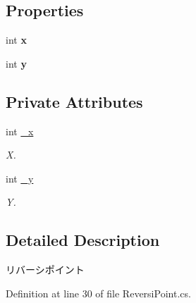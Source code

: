 \subsection*{Properties}
\begin{DoxyCompactItemize}
\item 
\mbox{\label{class_reversi_wpf_1_1_reversi_point_a11ec7c376f58804b60719a685f83fb8b}} 
int {\bfseries x}
\item 
\mbox{\label{class_reversi_wpf_1_1_reversi_point_ab397f2c0c30dd24fa825aea1f4b37539}} 
int {\bfseries y}
\end{DoxyCompactItemize}
\subsection*{Private Attributes}
\begin{DoxyCompactItemize}
\item 
\mbox{\label{class_reversi_wpf_1_1_reversi_point_ae3257bf58c3a3ea58d2dcb68e09246d9}} 
int \hyperlink{class_reversi_wpf_1_1_reversi_point_ae3257bf58c3a3ea58d2dcb68e09246d9}{\+\_\+x}
\begin{DoxyCompactList}\small\item\em X. \end{DoxyCompactList}\item 
\mbox{\label{class_reversi_wpf_1_1_reversi_point_ab13f86ec1795b79ed6fff4cee1b3cca6}} 
int \hyperlink{class_reversi_wpf_1_1_reversi_point_ab13f86ec1795b79ed6fff4cee1b3cca6}{\+\_\+y}
\begin{DoxyCompactList}\small\item\em Y. \end{DoxyCompactList}\end{DoxyCompactItemize}


\subsection{Detailed Description}
リバーシポイント 

Definition at line 30 of file Reversi\+Point.\+cs.



